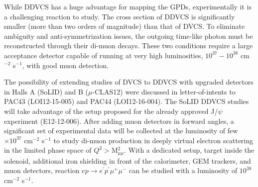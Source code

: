 While DDVCS has a huge advantage for mapping the GPDs, experimentally it is a challenging reaction to study.  The cross section of DDVCS is significantly smaller (more than two orders of magnitude) than that of DVCS. 
 To eliminate ambiguity and anti-symmetrization issues, the outgoing time-like photon must be reconstructed through their di-muon decays. These two conditions require a large acceptance detector capable of running at very high luminosities, $10^{37} -10^{38}$  cm$^{-2}$ s$^{-1}$, with good muon detection. %

\iffalse
\begin{figure}
\begin{center}
\texttt{[image: xs\_dvcs\_ddvcs\_6gev.pdf]}
\texttt{[image: bsa\_ddvcs.pdf]}
\caption{On the left differential cross sections for DVCS+BH and DDVCS+BH processes. On the right the beam spin asymmetry for the reaction $ep\to e^\prime p\mu^+\mu^-$ (DDVCS+BH) for different virtualities of the lepton pair : Q$^2$ = 0 GeV$^2$ (thick solid line), which corresponds to a DVCS calculation, 1.5 GeV$^2$ (thick dashed line), 2 GeV$^2$ (thick dash-dotted line), 2.8 GeV$^2$ (dotted line) 3.6 GeV$^2$ (thin solid line) and 4.4 GeV$^2$ (thin dashed line). Calculations and predictions from [M. Guidal and M. Vanderhaeghen. Phys. Rev. Lett. 90 (2003) 012001]. .}
\label{fig:xsddvcs} 
\end{center}
\end{figure}
\fi

The possibility of extending studies of DVCS to DDVCS with upgraded detectors in Halls A (SoLID) and B ($\mu$-CLAS12) were discussed in letter-of-intents to PAC43 (LOI12-15-005) and PAC44 (LOI12-16-004). The SoLID DDVCS studies will take advantage of the setup proposed for the already approved J/$\psi$ experiment (E12-12-006). After adding muon detectors in forward angles, a significant set of experimental data will be collected at the luminosity of few $\times 10^{37}$ cm$^{-2}$ s$^{-1}$ to study di-muon production in deeply virtual electron scattering in the limited phase space of $Q^2>$M$_{\mu\mu}^2$. With a dedicated setup, target inside the solenoid, additional iron shielding in front of the calorimeter, GEM trackers, and muon detectors, reaction $ep\to e^\prime p^\prime \mu^+ \mu^-$ can be studied with a luminosity of $10^{38}$ cm$^{-2}$ s$^{-1}$. 

